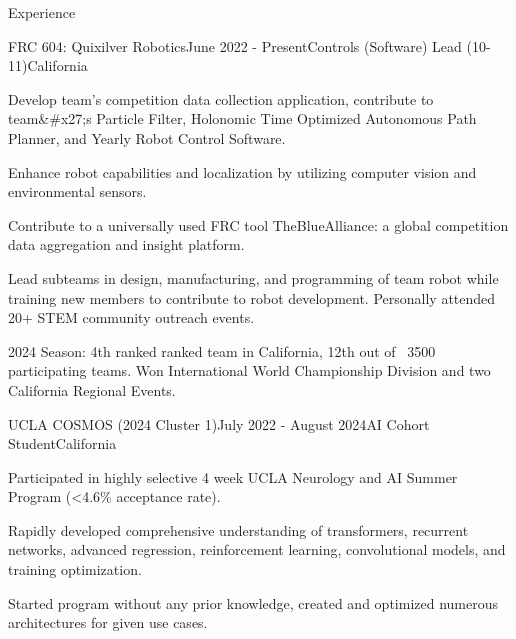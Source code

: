 \documentclass[
  11pt, %
]{public/resume/resume} %
\begin{document}

\begin{rSection}{Experience}


  \begin{rSubsection}{FRC 604: Quixilver Robotics}{June 2022 - Present}{Controls (Software) Lead (10-11)}{California}
    
    \item Develop team's competition data collection application, contribute to team&#x27;s Particle Filter, Holonomic Time Optimized Autonomous Path Planner, and Yearly Robot Control Software.
    
    \item Enhance robot capabilities and localization by utilizing computer vision and environmental sensors.
    
    \item Contribute to a universally used FRC tool TheBlueAlliance: a global competition data aggregation and insight platform.
    
    \item Lead subteams in design, manufacturing, and programming of team robot while training new members to contribute to robot development. Personally attended 20+ STEM community outreach events.
    
    \item 2024 Season: 4th ranked ranked team in California, 12th out of ~3500 participating teams. Won International World Championship Division and two California Regional Events.
    
  \end{rSubsection}
        
  \begin{rSubsection}{UCLA COSMOS (2024 Cluster 1)}{July 2022 - August 2024}{AI Cohort Student}{California}
    
    \item Participated in highly selective 4 week UCLA Neurology and AI Summer Program (<4.6\% acceptance rate).
    
    \item Rapidly developed comprehensive understanding of transformers, recurrent networks, advanced regression, reinforcement learning, convolutional models, and training optimization.
    
    \item Started program without any prior knowledge, created and optimized numerous architectures for given use cases.
    

\end{rSubsection}
\end{rSection}
\end{document}
